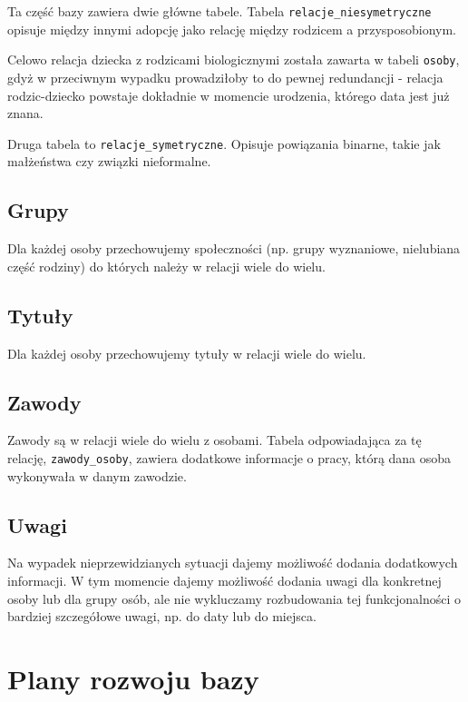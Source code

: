 \documentclass{article}
\begin{document}
Ta część bazy zawiera dwie główne tabele. Tabela \texttt{relacje\_niesymetryczne} opisuje między innymi adopcję jako relację między rodzicem a przysposobionym.

Celowo relacja dziecka z rodzicami biologicznymi została zawarta w tabeli \texttt{osoby}, gdyż w przeciwnym wypadku prowadziłoby to do pewnej redundancji - relacja
rodzic-dziecko powstaje dokładnie w momencie urodzenia, którego data jest już znana.

Druga tabela to \texttt{relacje\_symetryczne}. Opisuje powiązania binarne, takie jak małżeństwa czy związki nieformalne.

\subsection{Grupy}

Dla każdej osoby przechowujemy społeczności (np. grupy wyznaniowe, nielubiana część rodziny) do których należy w relacji wiele do wielu.

\subsection{Tytuły}

Dla każdej osoby przechowujemy tytuły w relacji wiele do wielu.

\subsection{Zawody}

Zawody są w relacji wiele do wielu z osobami. Tabela odpowiadająca za tę relację, \texttt{zawody\_osoby}, zawiera dodatkowe informacje o pracy, którą dana osoba wykonywała w danym zawodzie.

\subsection{Uwagi}

Na wypadek nieprzewidzianych sytuacji dajemy możliwość dodania dodatkowych informacji. W tym momencie dajemy możliwość dodania uwagi dla konkretnej osoby lub dla grupy osób, ale nie wykluczamy rozbudowania tej funkcjonalności o bardziej szczegółowe uwagi, np. do daty lub do miejsca.

\section{Plany rozwoju bazy}
\end{document}
